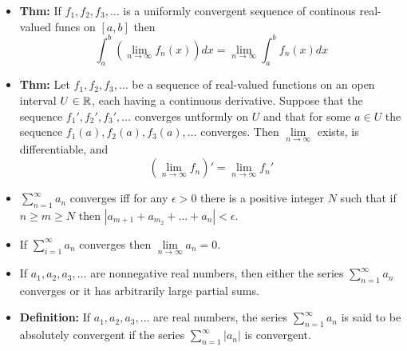 \documentclass[12pt]{article}
\begin{document}
\begin{itemize}
    \item \textbf{Thm:} If $f_1, f_2, f_3, \ldots$ is a uniformly convergent sequence of continous real-valued funcs on $[a,b]$ then 
    \[\int_a^b\left(\underset{n\to \infty}{\lim}f_n(x)\right)dx = \underset{n\to \infty}{\lim}\int_a^bf_n(x)dx\]
    \item \textbf{Thm:} Let $f_1, f_2, f_3, \ldots$ be a sequence of real-valued functions on an open interval $U \in \mathbb R$, each having a continuous derivative. Suppose that the sequence $f_1', f_2', f_3', \ldots$ converges untformly on $U$ and that for some $a\in U$ the sequence $f_1(a), f_2(a), f_3(a), \ldots$ converges. Then $\underset{n\to \infty}{\lim}$ exists, is differentiable, and
    \[\left(\underset{n\to \infty}{\lim} f_n\right)' = \underset{n\to \infty}{\lim}f_n'\]
    \item $\sum_{n=1}^\infty a_n$ converges iff for any $\epsilon > 0$ there is a positive integer $N$ such that if $n \geq m \geq N$ then $|a_{m+1} + a_{m_2} + \ldots +a_n| < \epsilon$.
    \item If $\sum_{i=1}^\infty a_n$  converges then $\underset{n\to \infty}{\lim}a_n =0$. 
    \item If $a_1, a_2, a_3, \ldots$ are nonnegative real numbers, then either the series $\sum_{n=1}^\infty a_n$ converges or it has arbitrarily large partial sums.
    \item \textbf{Definition:} If $a_1, a_2, a_3, \ldots$ are real numbers, the series $\sum_{n=1}^\infty a_n$  is said to be absolutely convergent if the series $\sum_{n=1}^\infty |a_n|$ is convergent.
\end{itemize}
\end{document}
